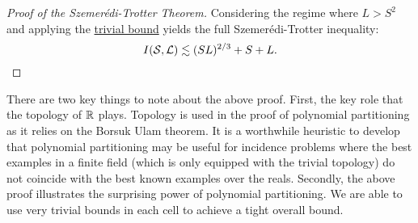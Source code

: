 \begin{proof}[Proof of the Szemerédi-Trotter Theorem]
Considering the regime where $L > S^2$ and applying the \hyperref[thm:trivial-ST-bounds]{trivial bound} yields the full Szemerédi-Trotter inequality:
\[
    I(\mathcal S, \mathcal L) \lesssim (SL)^{2/3} + S + L. 
\]
\end{proof}

There are two key things to note about the above proof. First, the key role that the topology of $\mathbb R$ plays. Topology is used in the proof of polynomial partitioning as
it relies on the Borsuk Ulam theorem. It is a worthwhile heuristic to develop that polynomial partitioning may be useful for incidence problems
where the best examples in a finite field (which is only equipped with the trivial topology) do not coincide with the best known examples over the reals.
Secondly, the above proof illustrates the surprising power of polynomial partitioning. We are able to use very trivial bounds in each cell to achieve
a tight overall bound. 
